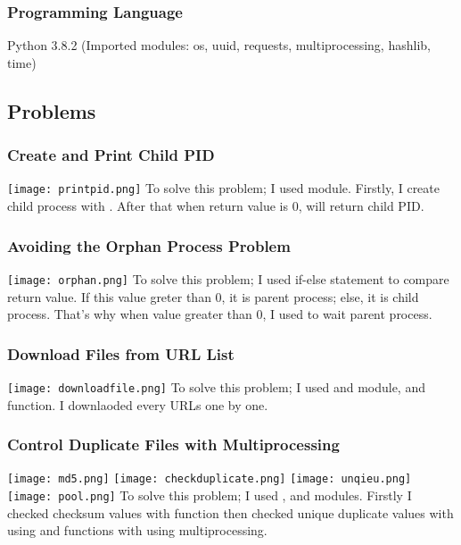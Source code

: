 \documentclass[]{article}
\begin{document}
\subsubsection*{Programming Language}
Python 3.8.2 (Imported modules: os, uuid, requests, multiprocessing, hashlib, time)

\subsection{Problems}

\subsubsection{Create and Print Child PID}
\texttt{[image: printpid.png]}
\newline To solve this problem; I used  module. Firstly, I create child process with . After that when return value is 0,  will return child PID.

\subsubsection{Avoiding the Orphan Process Problem}
\texttt{[image: orphan.png]}
\newline To solve this problem; I used if-else statement to compare
 return value. If this value greter than 0, it is parent process; else, it is child process. That's why when value greater than 0, I used  to wait parent process.

\subsubsection{Download Files from URL List}
\texttt{[image: downloadfile.png]}
\newline To solve this problem; I used  and  module, and  function. I downlaoded every URLs one by one.

\subsubsection{Control Duplicate Files with Multiprocessing}
\texttt{[image: md5.png]}\newline \newline
\texttt{[image: checkduplicate.png]}\newline \newline
\texttt{[image: unqieu.png]} \newline \newline
\texttt{[image: pool.png]}
\newline \newline To solve this problem; I used ,  and  modules. Firstly I checked checksum values with  function then checked unique duplicate values with using  and  functions with using multiprocessing.
\end{document}
